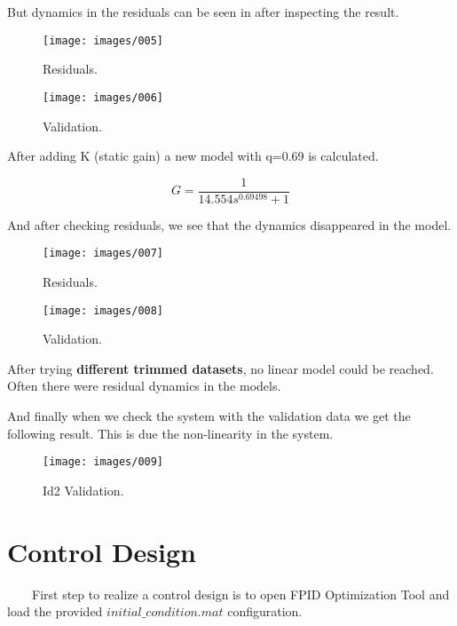 \documentclass[12pt,a4paper]{article}
\begin{document}
But dynamics in the residuals can be seen in after inspecting the result.


\begin{figure}[h]
	\caption{Residuals.}
	\texttt{[image: images/005]}
	\centering
\end{figure}

\FloatBarrier

\begin{figure}[h]
	\caption{Validation.}
	\texttt{[image: images/006]}
	\centering
\end{figure}

\FloatBarrier

After adding K (static gain) a new model with q=0.69 is calculated.

\begin{equation}
G = \frac{1}{14.554s^{0.69498}+1}
\end{equation}

And after checking residuals, we see that the dynamics disappeared in the model.

\begin{figure}[h]
	\caption{Residuals.}
	\texttt{[image: images/007]}
	\centering
\end{figure}

\FloatBarrier

\begin{figure}[h]
	\caption{Validation.}
	\texttt{[image: images/008]}
	\centering
\end{figure}

\FloatBarrier

After trying \textbf{different trimmed datasets}, no linear model could be reached. Often there were residual dynamics in the models.

And finally when we check the system with the validation data we get the following result. This is due the non-linearity in the system.

\begin{figure}[h]
	\caption{Id2 Validation.}
	\texttt{[image: images/009]}
	\centering
\end{figure}

\FloatBarrier

\section{Control Design}

\ \ \ \ First step to realize a control design is to open FPID Optimization Tool and load the provided $initial\_condition.mat$ configuration.
\end{document}
